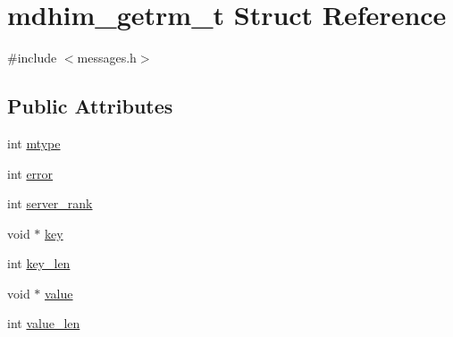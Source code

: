 \hypertarget{structmdhim__getrm__t}{\section{mdhim\-\_\-getrm\-\_\-t Struct Reference}
\label{d5/dfb/structmdhim__getrm__t}
}


{\ttfamily \#include $<$messages.\-h$>$}

\subsection*{Public Attributes}
\begin{DoxyCompactItemize}
\item 
int \hyperlink{structmdhim__getrm__t_af7c9cb5700c74dae330d00dcb53306a8}{mtype}
\item 
int \hyperlink{structmdhim__getrm__t_ab5a0bbbc5c249097b7ea3c71a8c59be9}{error}
\item 
int \hyperlink{structmdhim__getrm__t_ab7e6c3fdb4ba044166a37bf1e178b334}{server\-\_\-rank}
\item 
void $\ast$ \hyperlink{structmdhim__getrm__t_a03ac590954131b0bd04b767115b011d2}{key}
\item 
int \hyperlink{structmdhim__getrm__t_a91f0d874ba5b81f1d22a791f4936653c}{key\-\_\-len}
\item 
void $\ast$ \hyperlink{structmdhim__getrm__t_ae1e2ce047de1164dcdb1bcfe0f6fd0ae}{value}
\item 
int \hyperlink{structmdhim__getrm__t_af5959ca99312966ae31a7ffec962d9ea}{value\-\_\-len}
\end{DoxyCompactItemize}


